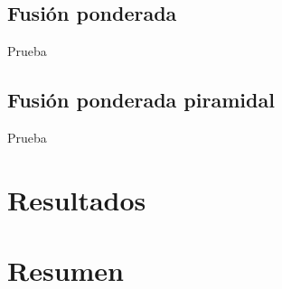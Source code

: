 \subsection{Fusión ponderada}
Prueba

\subsection{Fusión ponderada piramidal}
Prueba

\section{Resultados}

\section{Resumen}


